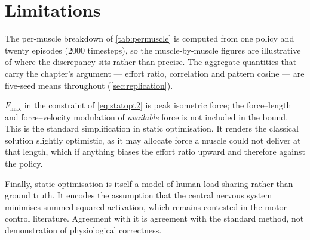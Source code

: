\section{Limitations}

The per-muscle breakdown of \cref{tab:permuscle} is computed from one policy and
twenty episodes (2000 timesteps), so the muscle-by-muscle figures are
illustrative of where the discrepancy sits rather than precise. The aggregate
quantities that carry the chapter's argument --- effort ratio, correlation and
pattern cosine --- are five-seed means throughout (\cref{sec:replication}).

$F_{\max}$ in the constraint of \cref{eq:statopt2} is peak isometric force; the
force--length and force--velocity modulation of \emph{available} force is not
included in the bound. This is the standard simplification in static
optimisation. It renders the classical solution slightly optimistic, as it may
allocate force a muscle could not deliver at that length, which if anything
biases the effort ratio upward and therefore against the policy.

Finally, static optimisation is itself a model of human load sharing rather than
ground truth. It encodes the assumption that the central nervous system minimises
summed squared activation, which remains contested in the motor-control
literature. Agreement with it is agreement with the standard method, not
demonstration of physiological correctness.
